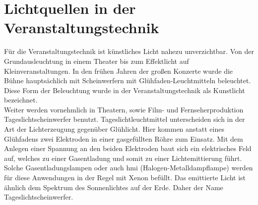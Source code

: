 \documentclass[11pt]{scrartcl}
\begin{document}
\section{Lichtquellen in der Veranstaltungstechnik}
Für die Veranstaltungstechnik ist künstliches Licht nahezu unverzichtbar. Von der Grundausleuchtung in einem Theater bis zum Effektlicht
auf Kleinveranstaltungen. In den frühen Jahren der großen Konzerte wurde die Bühne hauptsächlich mit Scheinwerfern mit Glühfaden-Leuchtmitteln beleuchtet.
Diese Form der Beleuchtung wurde in der Veranstaltungstechnik als Kunstlicht bezeichnet.\\
Weiter werden vornehmlich in Theatern, sowie Film- und Fernseherproduktion Tageslichtscheinwerfer benutzt. Tageslichtleuchtmittel
unterscheiden sich in der Art der Lichterzeugung gegenüber Glühlicht. Hier kommen anstatt eines Glühfadens zwei Elektroden in einer
gasgefüllten Röhre zum Einsatz. Mit dem Anlegen einer Spannung an den beiden Elektroden baut sich ein elektrisches Feld auf, welches zu
einer Gasentladung und somit zu einer Lichtemittierung führt. Solche Gasentladungslampen oder auch \ac{hmi} (Halogen-Metalldampflampe)
werden für diese Anwendungen in der Regel mit Xenon befüllt. Das emittierte Licht ist ähnlich dem Spektrum des Sonnenlichtes auf der
Erde. Daher der Name Tageslichtscheinwerfer.
\end{document}
